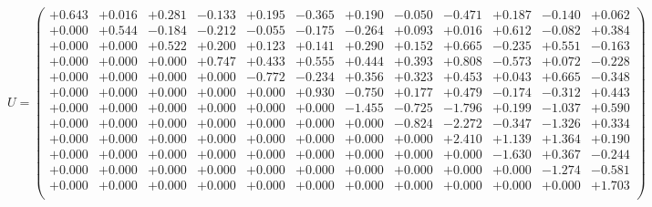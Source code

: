 \documentclass[9pt]{article}
\theoremstyle{plain}
\theoremstyle{definition}
\theoremstyle{remark}
\numberwithin{equation}{section}
\begin{document}
$U = \left(
\begin{array}{
cccccccccccc}
+0.643 & +0.016 & +0.281 & -0.133 & +0.195 & -0.365 & +0.190 & -0.050 & -0.471 & +0.187 & -0.140 & +0.062 \\
+0.000 & +0.544 & -0.184 & -0.212 & -0.055 & -0.175 & -0.264 & +0.093 & +0.016 & +0.612 & -0.082 & +0.384 \\
+0.000 & +0.000 & +0.522 & +0.200 & +0.123 & +0.141 & +0.290 & +0.152 & +0.665 & -0.235 & +0.551 & -0.163 \\
+0.000 & +0.000 & +0.000 & +0.747 & +0.433 & +0.555 & +0.444 & +0.393 & +0.808 & -0.573 & +0.072 & -0.228 \\
+0.000 & +0.000 & +0.000 & +0.000 & -0.772 & -0.234 & +0.356 & +0.323 & +0.453 & +0.043 & +0.665 & -0.348 \\
+0.000 & +0.000 & +0.000 & +0.000 & +0.000 & +0.930 & -0.750 & +0.177 & +0.479 & -0.174 & -0.312 & +0.443 \\
+0.000 & +0.000 & +0.000 & +0.000 & +0.000 & +0.000 & -1.455 & -0.725 & -1.796 & +0.199 & -1.037 & +0.590 \\
+0.000 & +0.000 & +0.000 & +0.000 & +0.000 & +0.000 & +0.000 & -0.824 & -2.272 & -0.347 & -1.326 & +0.334 \\
+0.000 & +0.000 & +0.000 & +0.000 & +0.000 & +0.000 & +0.000 & +0.000 & +2.410 & +1.139 & +1.364 & +0.190 \\
+0.000 & +0.000 & +0.000 & +0.000 & +0.000 & +0.000 & +0.000 & +0.000 & +0.000 & -1.630 & +0.367 & -0.244 \\
+0.000 & +0.000 & +0.000 & +0.000 & +0.000 & +0.000 & +0.000 & +0.000 & +0.000 & +0.000 & -1.274 & -0.581 \\
+0.000 & +0.000 & +0.000 & +0.000 & +0.000 & +0.000 & +0.000 & +0.000 & +0.000 & +0.000 & +0.000 & +1.703 \\
\end{array}
\right)$ \newline 
\end{document}
